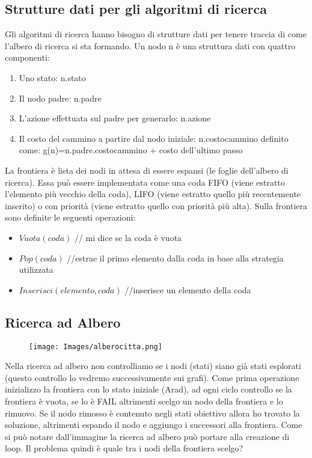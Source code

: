 \documentclass{article}
\begin{document}
\subsection{Strutture dati per gli algoritmi di ricerca}
Gli algoritmi di ricerca hanno bisogno di strutture dati per tenere traccia di come l'albero di ricerca si sta formando. \newline
Un nodo n è una struttura dati con quattro componenti:
\begin{enumerate}
    \item Uno stato: n.stato
    \item Il nodo padre: n.padre
    \item L'azione effettuata sul padre per generarlo: n.azione
    \item Il costo del cammino a partire dal nodo iniziale: n.costocammino definito come: \newline g(n)=n.padre.costocammino + costo dell'ultimo passo
\end{enumerate}
La frontiera è lista dei nodi in attesa di essere espansi (le foglie dell'albero di ricerca). Essa può essere implementata come una coda FIFO (viene estratto l'elemento più vecchio della coda), LIFO (viene estratto quello più recentemente inserito) o con priorità (viene estratto quello con priorità più alta). Sulla frontiera sono definite le seguenti operazioni:
\begin{itemize}
    \item $Vuota(coda)$ // mi dice se la coda è vuota
    \item $Pop(coda)$ //estrae il primo elemento dalla coda in base alla strategia utilizzata
    \item $Inserisci(elemento,coda)$ //inserisce un elemento della coda
\end{itemize}

\subsection{Ricerca ad Albero}
\begin{figure}[H]
    \centering
    \texttt{[image: Images/alberocitta.png]}
\end{figure}
Nella ricerca ad albero non controlliamo se i nodi (stati) siano già stati esplorati (questo controllo lo vedremo successivamente sui grafi). Come prima operazione inizializzo la frontiera con lo stato iniziale (Arad), ad ogni ciclo controllo se la frontiera è vuota, se lo è FAIL altrimenti scelgo un nodo della frontiera e lo rimuovo. Se il nodo rimosso è contenuto negli stati obiettivo allora ho trovato la soluzione, altrimenti espando il nodo e aggiungo i successori alla frontiera. Come si può notare dall'immagine la ricerca ad albero può portare alla creazione di loop. \newline
Il problema quindi è quale tra i nodi della frontiera scelgo?
\end{document}

